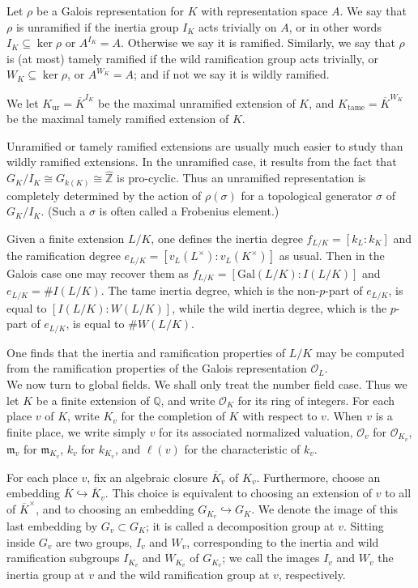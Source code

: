 \documentclass[12pt]{article}
\newcommand{\bbQ}{\mathbb{Q}}
\newcommand{\bbZ}{\mathbb{Z}}
\newcommand{\calO}{\mathcal{O}}
\newcommand{\fkm}{\mathfrak{m}}
\newcommand{\Gal}{\mathrm{Gal}}
\newcommand{\ov}[1]{\overline{#1}}
\newcommand{\ur}{\mathrm{ur}}
\newcommand{\wh}[1]{\widehat{#1}}
\begin{document}
Let $\rho$ be a Galois representation for $K$ with representation space $A$.  We say that $\rho$ is unramified if the inertia group $I_K$ acts trivially on $A$, or in other words $I_K \subseteq \ker \rho$ or $A^{I_K} = A$.  Otherwise we say it is ramified.  Similarly, we say that $\rho$ is (at most) tamely ramified if the wild ramification group acts trivially, or $W_K \subseteq \ker \rho$, or $A^{W_K} = A$; and if not we say it is wildly ramified.

We let $K_\ur = \ov{K}^{I_K}$ be the maximal unramified extension of $K$, and $K_\mathrm{tame} = \ov{K}^{W_K}$ be the maximal tamely ramified extension of $K$.

Unramified or tamely ramified extensions are usually much easier to study than wildly ramified extensions.  In the unramified case, it results from the fact that $G_K/I_K \cong G_{k(K)} \cong \wh{\bbZ}$ is pro-cyclic.  Thus an unramified representation is completely determined by the action of $\rho(\sigma)$ for a topological generator $\sigma$ of $G_K/I_K$.  (Such a $\sigma$ is often called a Frobenius element.)

Given a finite extension $L/K$, one defines the inertia degree $f_{L/K} = [k_L:k_K]$ and the ramification degree $e_{L/K} = [v_L(L^\times):v_L(K^\times)]$ as usual.  Then in the Galois case one may recover them as $f_{L/K} = [\Gal(L/K):I(L/K)]$ and $e_{L/K} = \#I(L/K)$.  The tame inertia degree, which is the non-$p$-part of $e_{L/K}$, is equal to $[I(L/K):W(L/K)]$, while the wild inertia degree, which is the $p$-part of $e_{L/K}$, is equal to $\#W(L/K)$.

One finds that the inertia and ramification properties of $L/K$ may be computed from the ramification properties of the Galois representation $\calO_L$.\\


We now turn to global fields.  We shall only treat the number field case.  Thus we let $K$ be a finite extension of $\bbQ$, and write $\calO_K$ for its ring of integers.  For each place $v$ of $K$, write $K_v$ for the completion of $K$ with respect to $v$.  When $v$ is a finite place, we write simply $v$ for its associated normalized valuation, $\calO_v$ for $\calO_{K_v}$, $\fkm_v$ for $\fkm_{K_v}$, $k_v$ for $k_{K_v}$, and $\ell(v)$ for the characteristic of $k_v$.

For each place $v$, fix an algebraic closure $\ov{K}_v$ of $K_v$.  Furthermore, choose an embedding $\ov{K} \hookrightarrow \ov{K}_v$.  This choice is equivalent to choosing an extension of $v$ to all of $\ov{K}^\times$, and to choosing an embedding $G_{K_v} \hookrightarrow G_K$.  We denote the image of this last embedding by $G_v \subset G_K$; it is called a decomposition group at $v$.  Sitting inside $G_v$ are two groups, $I_v$ and $W_v$, corresponding to the inertia and wild ramification subgroups $I_{K_v}$ and $W_{K_v}$ of $G_{K_v}$; we call the images $I_v$ and $W_v$ the inertia group at $v$ and the wild ramification group at $v$, respectively.
\end{document}
